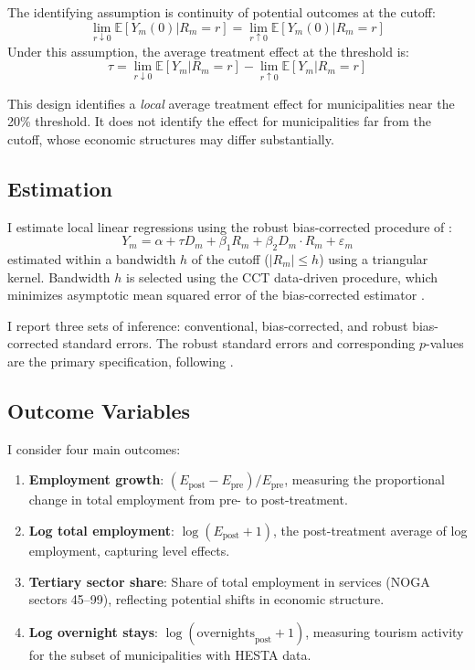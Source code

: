\documentclass[12pt]{article}
\newcommand{\E}{\mathbb{E}}
\begin{document}
The identifying assumption is continuity of potential outcomes at the cutoff:
\begin{equation}
\lim_{r \downarrow 0} \E[Y_m(0) | R_m = r] = \lim_{r \uparrow 0} \E[Y_m(0) | R_m = r]
\end{equation}
Under this assumption, the average treatment effect at the threshold is:
\begin{equation}\label{eq:tau}
\tau = \lim_{r \downarrow 0} \E[Y_m | R_m = r] - \lim_{r \uparrow 0} \E[Y_m | R_m = r]
\end{equation}

This design identifies a \textit{local} average treatment effect for municipalities near the 20\% threshold. It does not identify the effect for municipalities far from the cutoff, whose economic structures may differ substantially.

\subsection{Estimation}

I estimate local linear regressions using the robust bias-corrected procedure of \citet{calonico2014}:
\begin{equation}\label{eq:rdd}
Y_m = \alpha + \tau D_m + \beta_1 R_m + \beta_2 D_m \cdot R_m + \varepsilon_m
\end{equation}
estimated within a bandwidth $h$ of the cutoff ($|R_m| \leq h$) using a triangular kernel. Bandwidth $h$ is selected using the CCT data-driven procedure, which minimizes asymptotic mean squared error of the bias-corrected estimator \citep{calonico2020}.

I report three sets of inference: conventional, bias-corrected, and robust bias-corrected standard errors. The robust standard errors and corresponding $p$-values are the primary specification, following \citet{cattaneo2019}.

\subsection{Outcome Variables}

I consider four main outcomes:
\begin{enumerate}
\item \textbf{Employment growth}: $(E_{\text{post}} - E_{\text{pre}}) / E_{\text{pre}}$, measuring the proportional change in total employment from pre- to post-treatment.
\item \textbf{Log total employment}: $\log(E_{\text{post}} + 1)$, the post-treatment average of log employment, capturing level effects.
\item \textbf{Tertiary sector share}: Share of total employment in services (NOGA sectors 45--99), reflecting potential shifts in economic structure.
\item \textbf{Log overnight stays}: $\log(\text{overnights}_{\text{post}} + 1)$, measuring tourism activity for the subset of municipalities with HESTA data.
\end{enumerate}
\end{document}
